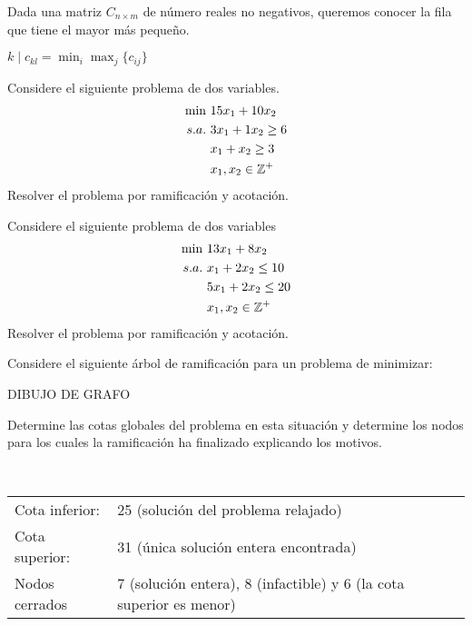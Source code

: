 \documentclass[twoside]{article}
\begin{document}
\newpage

\begin{ejercicio}{4}
Dada una matriz $C_{n\times m}$ de número reales no negativos, queremos conocer la fila que tiene el mayor más pequeño.
\end{ejercicio}
\begin{solucion}
$k\mid c_{kl}=\min_i\max_j\{c_{ij}\}$
\end{solucion}

\newpage

\begin{ejercicio}{5}
Considere el siguiente problema de dos variables.
\begin{align*}
\min\ & 15x_1+10x_2\\
s.a.\   & 3x_1+1x_2\geq 6\\
       & x_1+x_2\geq 3\\
       & x_1,x_2\in\mathbb{Z}^+
\end{align*}
Resolver el problema por ramificación y acotación.
\end{ejercicio}
\begin{solucion}
\end{solucion}

\newpage

\begin{ejercicio}{6}
Considere el siguiente problema de dos variables
\begin{align*}
\min\ & 13x_1+8x_2\\
s.a.\   & x_1+2x_2\leq 10\\
       & 5x_1+2x_2\leq 20\\
       & x_1,x_2\in\mathbb{Z}^+
\end{align*}
Resolver el problema por ramificación y acotación.
\end{ejercicio}
\begin{solucion}

\end{solucion}

\newpage

\begin{ejercicio}{7}
Considere el siguiente árbol de ramificación para un problema de minimizar:

DIBUJO DE GRAFO

Determine las cotas globales del problema en esta situación y determine los nodos para los cuales la ramificación ha finalizado explicando los motivos.
\end{ejercicio}
\begin{solucion}\

\begin{tabular}{l l}
Cota inferior: & 25 (solución del problema relajado) \\
Cota superior: & 31 (única solución entera encontrada) \\
Nodos cerrados & 7 (solución entera), 8 (infactible) y 6 (la cota superior es menor)
\end{tabular}
\end{solucion}
\end{document}
